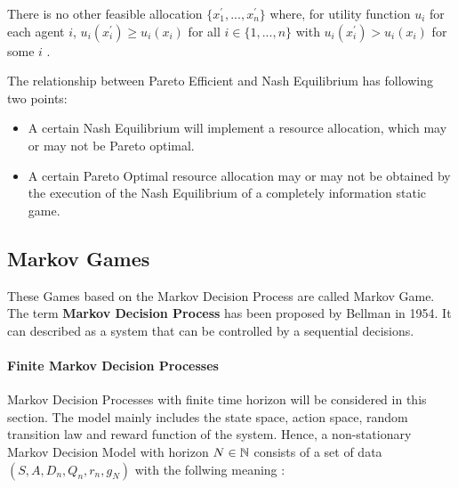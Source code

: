 \begin{proposition}
There is no other feasible allocation $\{x_{1}^{\prime},...,x_{n}^{\prime}\}$ where, for 
utility function $u_i$ for each agent $i$, $u_{i}(x_{i}^{\prime}) \geqslant u_{i}(x_{i})$ for all $i \in \{1,...,n\}$ with $u_{i}(x_{i}^{\prime})>u_{i}(x_{i})$ for some $i$ \parencite{Whinston1989}.
\end{proposition}

The relationship between Pareto Efficient and Nash Equilibrium has following two points:

\begin{itemize}
\item A certain Nash Equilibrium will implement a resource allocation, which may or may not be Pareto optimal.
\item A certain Pareto Optimal resource allocation may or may not be obtained by the execution of the Nash Equilibrium of a completely information static game.
\end{itemize}

\subsection{Markov Games} \label{background-game-theory-markov-game}
These Games based on the Markov Decision Process are called Markov Game. The term \textbf{Markov Decision Process} has been proposed by Bellman in 1954\parencite{Bellma1954}. It can described as a system that can be controlled by a sequential decisions.

\paragraph{Finite Markov Decision Processes}
Markov Decision Processes with finite time horizon will be considered in this section. The model mainly includes the state space, action space, random transition law and reward function of the system. Hence, a non-stationary Markov Decision Model with horizon $N \in \mathbb{N}$ consists of a set of data $(S, A, D_n, Q_n, r_n, g_N)$ with the follwing meaning \parencite{Bäuerle2010}:

